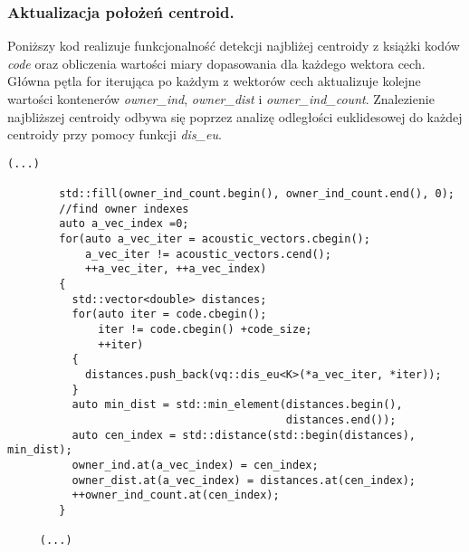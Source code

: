 \subsubsection{Aktualizacja położeń centroid.}
Poniższy kod realizuje funkcjonalność detekcji najbliżej centroidy z książki kodów \textit{code} oraz obliczenia wartości miary dopasowania dla każdego wektora cech. Główna pętla for iterująca po każdym z wektorów cech aktualizuje kolejne wartości kontenerów \textit{owner\_ind}, \textit{owner\_dist} i \textit{owner\_ind\_count}. Znalezienie najbliższej centroidy odbywa się poprzez analizę odległości euklidesowej do każdej centroidy przy pomocy funkcji \textit{dis\_eu}.
\begin{lstlisting}[style=lst:cpp, caption=Funkcja \textit{lbg}\label{lst:lbgbody4} - znalezienie najbliższej centroidy]
      (...)

        std::fill(owner_ind_count.begin(), owner_ind_count.end(), 0);
        //find owner indexes
        auto a_vec_index =0;
        for(auto a_vec_iter = acoustic_vectors.cbegin();
            a_vec_iter != acoustic_vectors.cend();
            ++a_vec_iter, ++a_vec_index)
        {
          std::vector<double> distances;
          for(auto iter = code.cbegin();
              iter != code.cbegin() +code_size;
              ++iter)
          {
            distances.push_back(vq::dis_eu<K>(*a_vec_iter, *iter));
          } 
          auto min_dist = std::min_element(distances.begin(),
                                           distances.end());
          auto cen_index = std::distance(std::begin(distances), min_dist);
          owner_ind.at(a_vec_index) = cen_index;
          owner_dist.at(a_vec_index) = distances.at(cen_index);
          ++owner_ind_count.at(cen_index);
        }

     (...)
\end{lstlisting}

